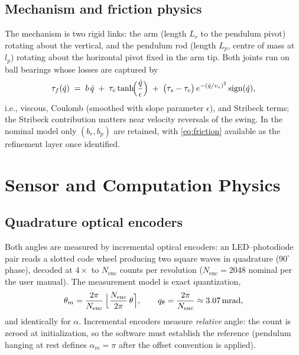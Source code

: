 \documentclass[conference]{IEEEtran}
\newcommand{\sign}{\operatorname{sign}}
\begin{document}
\subsection{Mechanism and friction physics}
The mechanism is two rigid links: the arm (length $L_r$ to the pendulum pivot) rotating about the vertical, and the pendulum rod (length $L_p$, centre of mass at $l_p$) rotating about the horizontal pivot fixed in the arm tip. Both joints run on ball bearings whose losses are captured by
\begin{equation}
\tau_f(\dot q) \;=\; b\,\dot q \;+\; \tau_c \tanh\!\Bigl(\frac{\dot q}{\epsilon}\Bigr)
\;+\;\bigl(\tau_s-\tau_c\bigr)\,e^{-(\dot q/v_s)^2}\sign(\dot q),
\label{eq:friction}
\end{equation}
i.e., viscous, Coulomb (smoothed with slope parameter $\epsilon$), and Stribeck terms; the Stribeck contribution matters near velocity reversals of the swing. In the nominal model only $(b_r, b_p)$ are retained, with \eqref{eq:friction} available as the refinement layer once identified.

\section{Sensor and Computation Physics}\label{sec:sensors}

\subsection{Quadrature optical encoders}
Both angles are measured by incremental optical encoders: an LED--photodiode pair reads a slotted code wheel producing two square waves in quadrature ($90^\circ$ phase), decoded at $4\times$ to $N_{\mathrm{enc}}$ counts per revolution ($N_{\mathrm{enc}}=2048$ nominal per the user manual). The measurement model is exact quantization,
\begin{equation}
\theta_m = \frac{2\pi}{N_{\mathrm{enc}}}\,\Bigl\lfloor \frac{N_{\mathrm{enc}}}{2\pi}\,\theta \Bigr\rceil,
\qquad
q_\theta = \frac{2\pi}{N_{\mathrm{enc}}} \approx 3.07\,\mathrm{mrad},
\label{eq:quant}
\end{equation}
and identically for $\alpha$. Incremental encoders measure \emph{relative} angle: the count is zeroed at initialization, so the software must establish the reference (pendulum hanging at rest defines $\alpha_m = \pi$ after the offset convention is applied).
\end{document}
